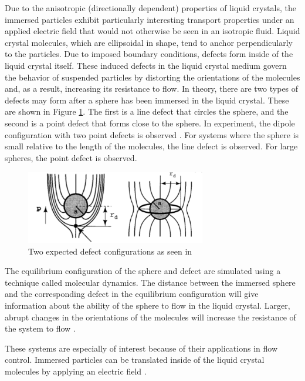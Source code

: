 \documentclass[preprint, aps]{revtex4-1}
\begin{document}
Due to the anisotropic (directionally dependent) properties of liquid crystals, 
the immersed particles exhibit particularly interesting transport properties 
under an applied electric field that would not otherwise be seen in an isotropic 
fluid. Liquid crystal molecules, which are ellipsoidal in shape, tend to anchor 
perpendicularly to the particles. Due to imposed boundary conditions, defects 
form inside of the liquid crystal itself. These induced defects in the liquid 
crystal medium govern the behavior of suspended particles by distorting the 
orientations of the molecules and, as a result, increasing its resistance to
flow. In theory, there are two types of defects may form after a sphere has been 
immersed in the liquid crystal. These are shown in Figure 
\ref{fig:defect-config}. The first is a line defect that circles the sphere, 
and the second is a point defect that forms close to the sphere. In experiment, 
the dipole configuration with two point defects is observed \cite{lubensky98}. 
For systems where the sphere is small relative to the length of the molecules, the
line defect is observed. For large spheres, the point defect is observed.
	\begin{figure}[H]
		\centering
		\includegraphics[width=0.7\textwidth]{defect-config.png}
		\caption{Two expected defect configurations as seen in 
		\cite{lubensky98}}
		\label{fig:defect-config}
	\end{figure}

The equilibrium configuration of the sphere and defect are simulated using a
technique called molecular dynamics. The distance between the immersed sphere 
and the corresponding defect in the equilibrium configuration will give 
information about the ability of the sphere to flow in the liquid crystal. 
Larger, abrupt changes in the orientations of the molecules will increase 
the resistance of the system to flow \cite{billeter00}.

These systems are especially of interest because of their applications in flow 
control. Immersed particles can be translated inside of the liquid crystal
molecules by applying an electric field \cite{conklin17}. 
\end{document}

